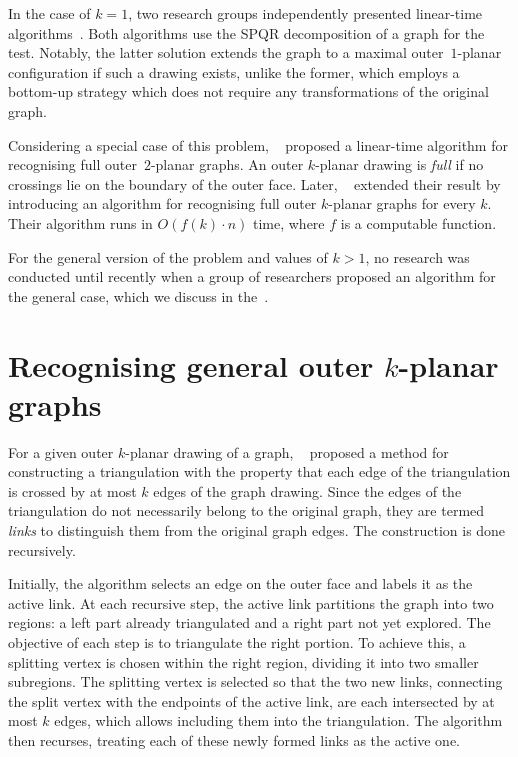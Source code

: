 In the case of \(k = 1\), two research groups independently presented linear-time algorithms~\cite{linear-o1p_, linear-o1p}. Both algorithms use the SPQR decomposition of a graph for the test. Notably, the latter solution extends the graph to a maximal outer~\(1\)-planar configuration if such a drawing exists, unlike the former, which employs a bottom-up strategy which does not require any transformations of the original graph.

Considering a special case of this problem, \citeauthor{linear-full-o2p}~\cite{linear-full-o2p} proposed a linear-time algorithm for recognising full outer~\(2\)-planar graphs. An outer \(k\)-planar drawing is \emph{full} if no crossings lie on the boundary of the outer face. Later, \citeauthor{linear-full-okp}~\cite{linear-full-okp} extended their result by introducing an algorithm for recognising full outer \(k\)-planar graphs for every \(k\). Their algorithm runs in \(O(f(k) \cdot n)\) time, where \(f\) is a computable function.

For the general version of the problem and values of \(k > 1\), no research was conducted until recently when a group of researchers proposed an algorithm for the general case, which we discuss in the~.


\section{Recognising general outer \texorpdfstring{\(k\)}{k}-planar graphs}\label{sec:recognising-general-outer-(k)-planar-graphs}

For a given outer \(k\)-planar drawing of a graph, \citeauthor{triangulations}~\cite{triangulations} proposed a method for constructing a triangulation with the property that each edge of the triangulation is crossed by at most \(k\) edges of the graph drawing. Since the edges of the triangulation do not necessarily belong to the original graph, they are termed \emph{links} to distinguish them from the original graph edges. The construction is done recursively.

Initially, the algorithm selects an edge on the outer face and labels it as the active link. At each recursive step, the active link partitions the graph into two regions: a left part already triangulated and a right part not yet explored. The objective of each step is to triangulate the right portion. To achieve this, a splitting vertex is chosen within the right region, dividing it into two smaller subregions. The splitting vertex is selected so that the two new links, connecting the split vertex with the endpoints of the active link, are each intersected by at most \(k\) edges, which allows including them into the triangulation. The algorithm then recurses, treating each of these newly formed links as the active one.

